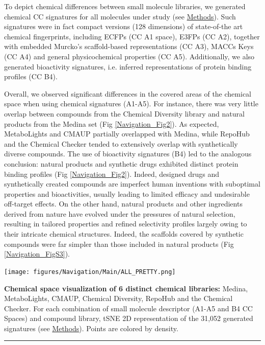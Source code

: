 To depict chemical differences between small molecule libraries, we generated chemical CC signatures for all molecules under study (see \hyperref[Navigation_Methods]{Methods}). Such signatures were in fact compact versions (128 dimensions) of state-of-the art chemical fingerprints, including ECFPs (CC A1 space), E3FPs (CC A2), together with embedded Murcko’s scaffold-based representations (CC A3), MACCs Keys (CC A4) and general physicochemical properties (CC A5). Additionally, we also generated bioactivity signatures, i.e. inferred representations of protein binding profiles (CC B4). 

Overall, we observed significant differences in the covered areas of the chemical space when using chemical signatures (A1-A5). For instance, there was very little overlap between compounds from the Chemical Diversity library and natural products from the Medina set (Fig \ref{Navigation_Fig2}). As expected, MetaboLights and CMAUP partially overlapped with Medina, while RepoHub and the Chemical Checker tended to extensively overlap with synthetically diverse compounds. The use of bioactivity signatures (B4) led to the analogous conclusion: natural products and synthetic drugs exhibited distinct protein binding profiles (Fig \ref{Navigation_Fig2}). Indeed, designed drugs and synthetically created compounds are imperfect human inventions with suboptimal properties and bioactivities, usually leading to limited efficacy and undesirable off-target effects. On the other hand, natural products and other ingredients derived from nature have evolved under the pressures of natural selection, resulting in tailored properties and refined selectivity profiles largely owing to their intricate chemical structures. Indeed, the scaffolds covered by synthetic compounds were far simpler than those included in natural products (Fig \ref{Navigation_FigS3}). 




\begin{Figure_modified}
  \centering
  \texttt{[image: figures/Navigation/Main/ALL\_PRETTY.png]}
  \caption{\textbf{Chemical space visualization of 6 distinct chemical libraries:} Medina, MetaboLights\cite{yurekten_metabolights_2024, haug_metabolights_2019}, CMAUP\cite{hou_cmaup_2024, zeng_cmaup_2019}, Chemical Diversity, RepoHub\cite{corsello_drug_2017} and the Chemical Checker\cite{duran-frigola_extending_2020}. For each combination of small molecule descriptor (A1-A5 and B4 CC Spaces) and compound library, tSNE 2D representation of the 31,052 generated signatures (see \hyperref[Navigation_Methods]{Methods}). Points are colored by density.
}
  \vspace{-5mm}
  \rule[0ex]{\textwidth}{0.5pt}
  \vspace{-9mm}
  \label{Navigation_Fig2}
\end{Figure_modified}







